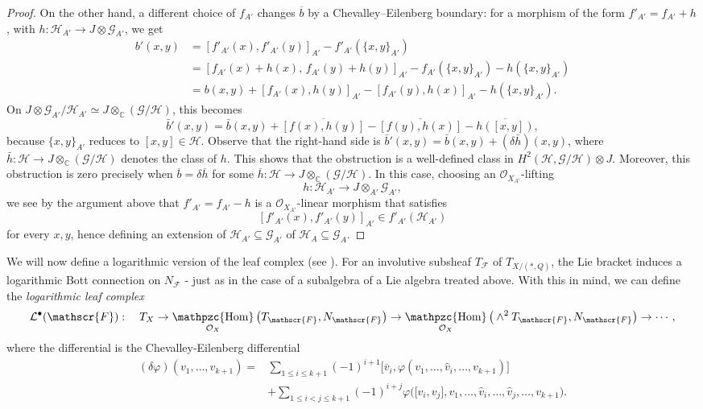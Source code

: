 \documentclass[reqno]{amsart}
\newcommand\C{\mathbb{C}}
\newcommand{\OO}{\mathcal{O}}
\newcommand{\F}{\mathscr{F}}
\DeclareMathOperator{\sHom}{\mathpzc{Hom}}
\theoremstyle{definition}
\theoremstyle{named}
\begin{document}
\begin{proof}
On the other hand, a different choice of $f_{A'}$ changes $\overline{b}$ by a Chevalley--Eilenberg boundary: for a morphism of the form $f'_{A'}=f_{A'}+h$, with $h:\mathcal H_{A'}\to J\otimes\mathcal G_{A'}$, we get
\begin{align*}
b'(x,y)
&=
[f'_{A'}(x),f'_{A'}(y)]_{A'}-f'_{A'}(\{x,y\}_{A'}) \\
&=
[f_{A'}(x)+h(x),\,f_{A'}(y)+h(y)]_{A'}
   -f_{A'}(\{x,y\}_{A'})-h(\{x,y\}_{A'}) \\
&=b(x,y)+[f_{A'}(x),h(y)]_{A'}-[f_{A'}(y),h(x)]_{A'}
   -h(\{x,y\}_{A'}).
\end{align*}
On $J\otimes \mathcal G_{A'}/\mathcal H_{A'}\simeq J\otimes_\C(\mathcal G/\mathcal H)$, this becomes
\[
\bar b'(x,y)
=
\bar b(x,y)
+\overline{[f(x),h(y)]}
-\overline{[f(y),h(x)]}
-\overline{h([x,y])},
\]
because $\{x,y\}_{A'}$ reduces to $[x,y]\in\mathcal H$.
Observe that the right-hand side is
$\bar b'(x,y)=\bar b(x,y)+(\delta\bar h)(x,y)$,
where $\bar h:\mathcal H\to J\otimes_\C(\mathcal G/\mathcal H)$ denotes the class of $h$. This shows that the obstruction is a well-defined class in
$
H^2(\mathcal H,\mathcal G/\mathcal H)\otimes J.
$
Moreover, this obstruction is zero precisely when $\overline{b}=\delta \overline{h} $ for some $\overline{h}:\mathcal H\to J\otimes_\C(\mathcal G/\mathcal H)$. In this case, choosing an $\OO_{X_{A'}}$-lifting
$$
h:\mathcal H_{A'}\to J\otimes_{A'} \mathcal G_{A'},
$$
we see by the argument above that $f'_{A'}=f_{A'}-h$
is a $\OO_{X_{A'}}$-linear morphism that satisfies
\[
[ f'_{A'}(x),f'_{A'}(y)]_{A'} \in f'_{A'}(\mathcal H_{A'})
\]
for every $x,y$, hence defining an extension of $\mathcal H_{A'}\subseteq \mathcal G_{A'}$ of $\mathcal H_A\subseteq \mathcal G_A$.
\end{proof}

We will now define a logarithmic version of the leaf complex (see \cite{gomez1988transverse}). For an involutive subsheaf $T_\F$ of $T_{X/(\ast,Q)}$, the Lie bracket induces a logarithmic Bott connection on $N_\F$ - just as in the case of a subalgebra of a Lie algebra treated above. With this in mind, we can define the \emph{logarithmic leaf complex}
\[
\mathcal L^\bullet(\F):\quad T_X\rightarrow \sHom_{\OO_X}\big(T_\F,N_\F\big) \rightarrow \sHom_{\OO_X}\big(\wedge^2T_\F,N_\F\big) \rightarrow \cdots,
\]
where the differential is the Chevalley-Eilenberg differential
\begin{align*}
(\delta\varphi)(v_1,\dots,v_{k+1}) = &\sum_{1\leqslant i\leqslant k+1} (-1)^{i+1}\big[\overline{v}_i,\varphi(v_1,\dots,\widehat{v}_i,\dots,v_{k+1})\big]\\
&+\sum_{1\leqslant i<j\leqslant k+1} (-1)^{i+j} \varphi\big(\big[v_i,v_j\big],v_1,\dots,\widehat{v}_i,\dots,\widehat{v}_j,\dots,v_{k+1}\big).
\end{align*}
\end{document}

